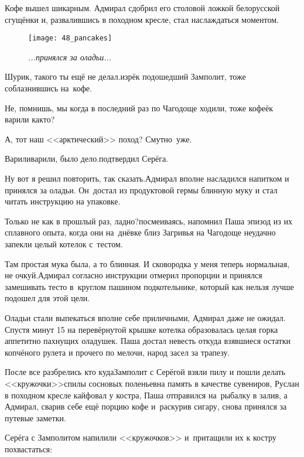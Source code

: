 Кофе вышел шикарным. Адмирал сдобрил его столовой ложкой белорусской сгущёнки и, развалившись в походном кресле, стал наслаждаться моментом.

\newpage

\begin{wrapfigure}[20]{r}{0.58\textwidth}
	\centering
	\texttt{[image: 48\_pancakes]}
	\caption{\small\textit{...принялся за оладьи...}}
\end{wrapfigure}
\diagdash Шурик, такого ты ещё не делал.\mdash изрёк подошедший Замполит, тоже соблазнившись на~кофе.

\diagdash Не, помнишь, мы когда в последний раз по Чагодоще ходили, тоже кофеёк варили как\sdash то?

\diagdash А, тот наш <<арктический>> поход? Смутно~уже.

\diagdash Варили\sdash варили, было дело.\mdash подтвердил Серёга.

\diagdash Ну вот я решил повторить, так сказать.\mdash Адмирал вполне насладился напитком и принялся за оладьи. Он~достал из продуктовой гермы блинную муку и стал читать инструкцию на упаковке.

\diagdash Только не как в прошлый раз, ладно?\mdash посмеиваясь, напомнил Паша эпизод из их сплавного опыта, когда они на~днёвке близ Загривья на Чагодоще неудачно запекли целый котелок с~тестом.

\diagdash Там простая мука была, а то блинная. И сковородка у меня теперь нормальная, не очкуй.\mdash Адмирал согласно инструкции отмерил пропорции и принялся замешивать тесто в~круглом пашином подкотельнике, который как нельзя лучше подошел для этой цели.

Оладьи стали выпекаться вполне себе приличными, Адмирал даже не ожидал. Спустя минут 15 на перевёрнутой крышке котелка образовалась целая горка аппетитно пахнущих оладушек. Паша достал невесть откуда взявшиеся остатки копчёного рулета и прочего по мелочи, народ засел за трапезу.

После все разбрелись кто куда\mdash Замполит с Серёгой взяли пилу и пошли делать <<кружочки>>\mdash спилы сосновых поленьев\mdash на память в качестве сувениров, Руслан в походном кресле кайфовал у костра, Паша отправился на~рыбалку в залив, а Адмирал, сварив себе ещё порцию кофе и~раскурив сигару, снова принялся за путевые заметки.

Серёга с Замполитом напилили <<кружочков>> и~притащили их к костру похвастаться:

